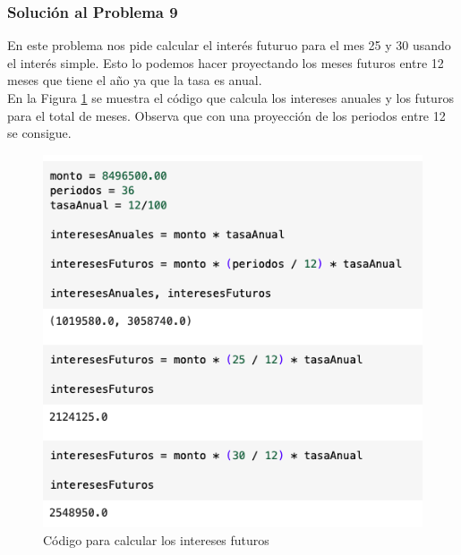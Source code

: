 \documentclass{article}
\begin{document}
\clearpage

\subsubsection*{Solución al Problema 9}

En este problema nos pide calcular el interés futuruo para el mes 25 y 30 usando el interés simple. Esto lo podemos hacer proyectando los meses futuros entre 12 meses que tiene el año ya que la tasa es anual. 
\\[12pt]
En la Figura \ref{fig:s109-1} se muestra el código que calcula los intereses anuales y los futuros para el total de meses. Observa que con una proyección de los periodos entre 12 se consigue.
\begin{figure}[!ht]
    \centering
    \begin{minipage}{\textwidth}
        \centering
        \includegraphics[width=\textwidth]{figures/s109-1.png}
    \end{minipage}
    \captionsetup{width=\textwidth}
    \caption{Código para calcular los intereses futuros}
    \label{fig:s109-1}
\end{figure}
\end{document}
